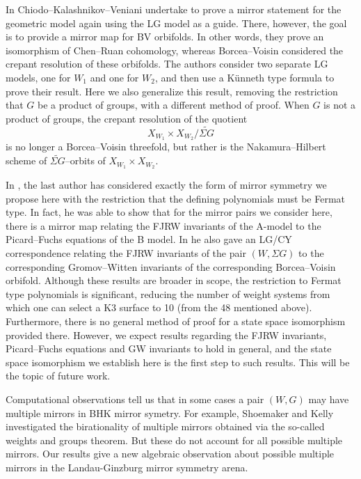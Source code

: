 \documentclass[10pt, letterpaper]{amsart}
\theoremstyle{remark}
\newcommand{\s}[1]{\Sigma #1}
\begin{document}
In \cite{CKV} Chiodo--Kalashnikov--Veniani undertake to prove a mirror statement for the geometric model again using the LG model as a guide. There, however, the goal is to provide a mirror map for BV orbifolds. In other words, they prove an isomorphism of Chen--Ruan cohomology, whereas Borcea--Voisin considered the crepant resolution of these orbifolds. The authors consider two separate LG models, one for $W_1$ and one for $W_2$, and then use a K\"unneth type formula to prove their result. Here we also generalize this result, removing the restriction that $G$ be a product of groups, with a different method of proof. When $G$ is not a product of groups, the crepant resolution of the quotient
\[
X_{W_1}\times X_{W_2}/\widetilde{\s{G}}
\] 
is no longer a Borcea--Voisin threefold, but rather is the Nakamura--Hilbert scheme of $\widetilde{\s{G}}$--orbits of $X_{W_1}\times X_{W_2}$.

In \cite{Schaug}, the last author has considered exactly the form of mirror symmetry we propose here with the restriction that the defining polynomials must be Fermat type. In fact, he was able to show that for the mirror pairs we consider here, there is a mirror map relating the FJRW invariants of the A-model to the Picard--Fuchs equations of the B model. In \cite{Schaug2} he also gave an LG/CY correspondence relating the FJRW invariants of the pair $(W,\s{G})$ to the corresponding Gromov--Witten invariants of the corresponding Borcea--Voisin orbifold. Although these results are broader in scope, the restriction to Fermat type polynomials is  significant, reducing the number of weight systems from which one can select a K3 surface to 10 (from the 48 mentioned above). Furthermore, there is no general method of proof for a state space isomorphism provided there. However, we expect results regarding the FJRW invariants, Picard--Fuchs equations and GW invariants to hold in general, and the state space isomorphism we establish here is the first step to such results. This will be the topic of future work. 

Computational observations tell us that in some cases a pair $(W,G)$ may have multiple mirrors in BHK mirror symetry.  For example, Shoemaker \cite{shoemaker} and Kelly \cite{kelly} investigated the birationality of multiple mirrors obtained via the so-called weights and groups theorem. But these do not account for all possible multiple mirrors.  Our results give a new algebraic observation about possible multiple mirrors in the Landau-Ginzburg mirror symmetry arena.
\end{document}
